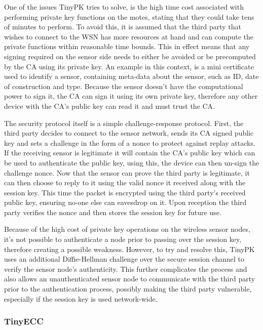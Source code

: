 \documentclass{mprop}
\begin{document}
One of the issues TinyPK tries to solve, is the high time cost associated with performing private key functions on the motes, stating that they could take tens of minutes to perform. To avoid this, it is assumed that the third party that wishes to connect to the WSN has more resources at hand and can compute the private functions within reasonable time bounds. This in effect means that any signing required on the sensor side needs to either be avoided or be precomputed by the CA using its private key. An example in this context, is a mini certificate used to identify a sensor, containing meta-data about the sensor, such as ID, date of construction and type. Because the sensor doesn't have the computational power to sign it, the CA can sign it using its own private key, therefore any other device with the CA's public key can read it and must trust the CA.

The security protocol itself is a simple challenge-response protocol. First, the third party decides to connect to the sensor network, sends its CA signed public key and sets a challenge in the form of a nonce to protect against replay attacks. If the receiving sensor is legitimate it will contain the CA's public key which can be used to authenticate the public key, using this, the device can then un-sign the challenge nonce. Now that the sensor can prove the third party is legitimate, it can then choose to reply to it using the valid nonce it received along with the session key. This time the packet is encrypted using the third party's received public key, ensuring no-one else can eavesdrop on it. Upon reception the third party verifies the nonce and then stores the session key for future use. 

Because of the high cost of private key operations on the wireless sensor nodes, it's not possible to authenticate a node prior to passing over the session key, therefore creating a possible weakness. However, to try and resolve this, TinyPK uses an additional Diffie-Hellman challenge over the secure session channel to verify the sensor node's authenticity. This further complicates the process and also allows an unauthenticated sensor node to communicate with the third party prior to the authentication process, possibly making the third party vulnerable, especially if the session key is used network-wide.

\subsubsection{TinyECC} %
\label{ssub:tinyecc}

\end{document}
